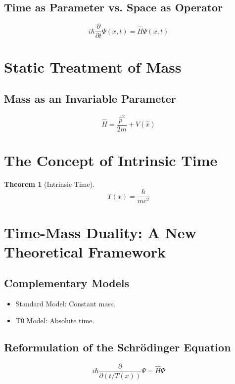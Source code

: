\documentclass[12pt,a4paper]{article}
\newcommand{\Tfield}{T(x)}
\newtheorem{theorem}{Theorem}[section]
\begin{document}
	\subsection{Time as Parameter vs. Space as Operator}
	\begin{equation}
		i\hbar \frac{\partial}{\partial t}\Psi(x,t) = \hat{H}\Psi(x,t)
	\end{equation}
	
	\section{Static Treatment of Mass}
	\subsection{Mass as an Invariable Parameter}
	\begin{equation}
		\hat{H} = \frac{\hat{p}^2}{2m} + V(\hat{x})
	\end{equation}
	
	\section{The Concept of Intrinsic Time}
	\begin{theorem}[Intrinsic Time]
		\begin{equation}
			\Tfield = \frac{\hbar}{mc^2}
		\end{equation}
	\end{theorem}
	
	\section{Time-Mass Duality: A New Theoretical Framework}
	\subsection{Complementary Models}
	\begin{itemize}
		\item Standard Model: Constant mass.
		\item T0 Model: Absolute time.
	\end{itemize}
	
	\subsection{Reformulation of the Schrödinger Equation}
	\begin{equation}
		i\hbar \frac{\partial}{\partial (t/\Tfield)}\Psi = \hat{H}\Psi
	\end{equation}
	
\end{document}
